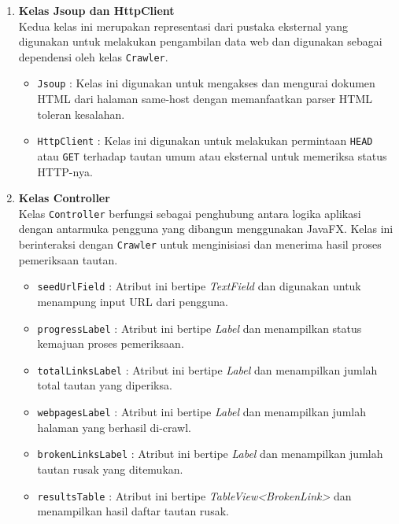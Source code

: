\begin{enumerate}
    \item \textbf{Kelas Jsoup dan HttpClient}\\
    Kedua kelas ini merupakan representasi dari pustaka eksternal yang digunakan untuk melakukan pengambilan data web dan digunakan sebagai dependensi oleh kelas \texttt{Crawler}.
    \begin{itemize}
        \item \texttt{Jsoup} : Kelas ini digunakan untuk mengakses dan mengurai dokumen HTML dari halaman same-host dengan memanfaatkan parser HTML toleran kesalahan.
        \item \texttt{HttpClient} : Kelas ini digunakan untuk melakukan permintaan \texttt{HEAD} atau \texttt{GET} terhadap tautan umum atau eksternal untuk memeriksa status HTTP-nya.
    \end{itemize}

    \item \textbf{Kelas Controller}\\
    Kelas \texttt{Controller} berfungsi sebagai penghubung antara logika aplikasi dengan antarmuka pengguna yang dibangun menggunakan JavaFX. Kelas ini berinteraksi dengan \texttt{Crawler} untuk menginisiasi dan menerima hasil proses pemeriksaan tautan.
    \begin{itemize}
        
        \item \texttt{seedUrlField} : Atribut ini bertipe \textit{TextField} dan digunakan untuk menampung input URL dari pengguna.
            
        \item \texttt{progressLabel} : Atribut ini bertipe \textit{Label} dan menampilkan status kemajuan proses pemeriksaan.
            
        \item \texttt{totalLinksLabel} : Atribut ini bertipe \textit{Label} dan menampilkan jumlah total tautan yang diperiksa.
        
        \item \texttt{webpagesLabel} : Atribut ini bertipe \textit{Label} dan menampilkan jumlah halaman yang berhasil di-crawl.
        
        \item \texttt{brokenLinksLabel} : Atribut ini bertipe \textit{Label} dan menampilkan jumlah tautan rusak yang ditemukan.
        
        \item \texttt{resultsTable} : Atribut ini bertipe \textit{TableView<BrokenLink>} dan menampilkan hasil daftar tautan rusak.
        

\end{itemize}
\end{enumerate}
